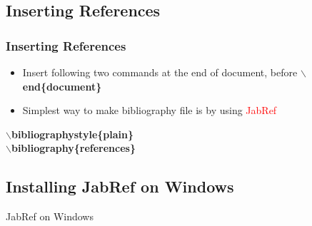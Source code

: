 \documentclass [9pt] {beamer}
\begin{document}
\subsection{Inserting References}
\begin{frame}\frametitle{Inserting References}
\rm
\fontsize{9pt}{11pt}\selectfont
\begin{itemize}
\item Insert  following two commands at the end of document, before \textbf{$\backslash$end\{document\}}\\[.30cm]
\item Simplest way to make bibliography file is by using \textcolor{red}{JabRef}\\[.30cm]
\end{itemize}
{\bf $\backslash$bibliographystyle\{{\color{red}plain}\}\\[.30cm]
$\backslash$bibliography\{{\color{red}references}\}}
\end{frame}
%
%


\subsection{Installing JabRef on Windows}
\begin{frame}{JabRef on Windows}%
\begin{figure}
\end{figure}

\end{frame}
\end{document}
